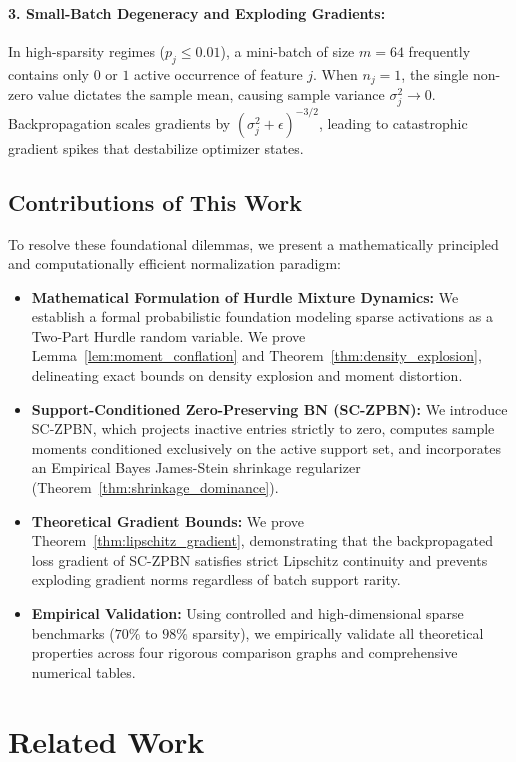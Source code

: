 \documentclass[twocolumn,10pt]{article}
\begin{document}
\paragraph{3. Small-Batch Degeneracy and Exploding Gradients:}
In high-sparsity regimes ($p_j \le 0.01$), a mini-batch of size $m=64$ frequently contains only $0$ or $1$ active occurrence of feature $j$. When $n_j=1$, the single non-zero value dictates the sample mean, causing sample variance $\sigma_j^2 \to 0$. Backpropagation scales gradients by $(\sigma_j^2 + \epsilon)^{-3/2}$, leading to catastrophic gradient spikes that destabilize optimizer states.

\subsection{Contributions of This Work}
To resolve these foundational dilemmas, we present a mathematically principled and computationally efficient normalization paradigm:
\begin{itemize}
    \item \textbf{Mathematical Formulation of Hurdle Mixture Dynamics:} We establish a formal probabilistic foundation modeling sparse activations as a Two-Part Hurdle random variable. We prove Lemma~\ref{lem:moment_conflation} and Theorem~\ref{thm:density_explosion}, delineating exact bounds on density explosion and moment distortion.
    \item \textbf{Support-Conditioned Zero-Preserving BN (SC-ZPBN):} We introduce SC-ZPBN, which projects inactive entries strictly to zero, computes sample moments conditioned exclusively on the active support set, and incorporates an Empirical Bayes James-Stein shrinkage regularizer (Theorem~\ref{thm:shrinkage_dominance}).
    \item \textbf{Theoretical Gradient Bounds:} We prove Theorem~\ref{thm:lipschitz_gradient}, demonstrating that the backpropagated loss gradient of SC-ZPBN satisfies strict Lipschitz continuity and prevents exploding gradient norms regardless of batch support rarity.
    \item \textbf{Empirical Validation:} Using controlled and high-dimensional sparse benchmarks ($70\%$ to $98\%$ sparsity), we empirically validate all theoretical properties across four rigorous comparison graphs and comprehensive numerical tables.
\end{itemize}

\section{Related Work}
\label{sec:related}
\end{document}
